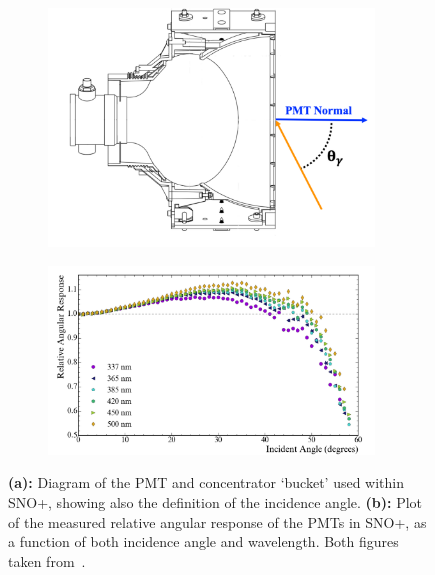\begin{figure}
    \centering
    \begin{subfigure}{0.3\textwidth}
        \centering
        \includegraphics[width=0.95\textwidth]{2_Detector/Figs/pmt_bucket_assembly.png}
        \caption{}
        \label{fig:pmt_conc_diagram}
    \end{subfigure}
    \begin{subfigure}{0.69\textwidth}
        \centering
        \includegraphics[width=0.95\textwidth]{2_Detector/Figs/PMTResponse.png}
        \caption{}
        \label{fig:pmt_angular_response}
    \end{subfigure}
    \caption[Diagram of the PMT and concentrator `bucket' used within SNO+; and plot of the measured relative angular response of the PMTs in SNO+]{\textbf{(a):} Diagram of the PMT and concentrator `bucket' used within SNO+, showing also the definition of the incidence angle. \textbf{(b):} Plot of the measured relative angular response of the PMTs in SNO+, as a function of both incidence angle and wavelength. Both figures taken from~\cite{andersonOpticalCalibrationSNO2021}.
    }
    \label{fig:pmt_optics}
\end{figure}

